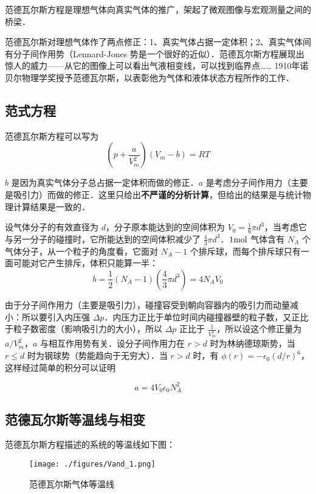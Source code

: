 
\begin{issues}
\issueDraft
\end{issues}

范德瓦尔斯方程是理想气体向真实气体的推广，架起了微观图像与宏观测量之间的桥梁．

范德瓦尔斯对理想气体作了两点修正：1、真实气体占据一定体积；2、真实气体间有分子间作用势（Lennard-Jones 势是一个很好的近似）．范德瓦尔斯方程展现出惊人的威力——从它的图像上可以看出气液相变线，可以找到临界点…… 1910年诺贝尔物理学奖授予范德瓦尔斯，以表彰他为气体和液体状态方程所作的工作．

\subsection{范式方程}
范德瓦尔斯方程可以写为
\begin{equation}
\left(p+\frac{a}{V_m^2}\right)(V_m-b)=RT
\end{equation}

$b$ 是因为真实气体分子总占据一定体积而做的修正．$a$ 是考虑分子间作用力（主要是吸引力）而做的修正．这里只给出\textbf{不严谨的分析计算}，但给出的结果是与统计物理计算结果是一致的．

设气体分子的有效直径为 $d$，分子原本能达到的空间体积为 $V_0=\frac{1}{6}\pi d^3$，当考虑它与另一分子的碰撞时，它所能达到的空间体积减少了 $\frac{4}{3}\pi d^3$．$1\rm mol$ 气体含有 $N_A$ 个气体分子，从一个粒子的角度看，它面对 $N_A-1$ 个排斥球，而每个排斥球只有一面可能对它产生排斥，体积只能算一半：
\begin{equation}
b=\frac{1}{2}(N_A-1)(\frac{4}{3}\pi d^3)=4N_A V_0
\end{equation}

由于分子间作用力（主要是吸引力），碰撞容受到朝向容器内的吸引力而动量减小：所以要引入内压强 $\Delta p$．内压力正比于单位时间内碰撞器壁的粒子数，又正比于粒子数密度（影响吸引力的大小），所以 $\Delta p$ 正比于 $\frac{1}{V_m^2}$，所以设这个修正量为 $a/V_m^2$，$a$ 与相互作用势有关．设分子间作用力在 $r>d$ 时为林纳德琼斯势，当 $r\le d$ 时为钢球势（势能趋向于无穷大）．当 $r>d$ 时，有 $\phi(r)=-\epsilon_0(d/r)^6$，这样经过简单的积分可以证明

\begin{equation}
a=4V_0\epsilon_0 N_A^2
\end{equation}

\subsection{范德瓦尔斯等温线与相变}
范德瓦尔斯方程描述的系统的等温线如下图：
\begin{figure}[ht]
\centering
\texttt{[image: ./figures/Vand\_1.png]}
\caption{范德瓦尔斯气体等温线} \label{Vand_fig1}
\end{figure}

